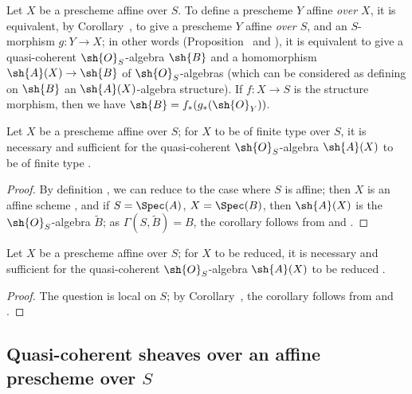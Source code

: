 \begin{env}[1.3.6]
\label{II.1.3.6}
Let $X$ be a prescheme affine over $S$.
To define a prescheme $Y$ affine \emph{over $X$}, it is equivalent, by Corollary~, to give a prescheme $Y$ affine \emph{over $S$}, and an $S$-morphism $g:Y\to X$; in other words (Proposition~ and ), it is equivalent to give a quasi-coherent $\sh{O}_S$-algebra $\sh{B}$ and a homomorphism $\sh{A}(X)\to\sh{B}$ of $\sh{O}_S$-algebras (which can be considered as defining on $\sh{B}$ an $\sh{A}(X)$-algebra structure).
If $f:X\to S$ is the structure morphism, then we have $\sh{B}=f_*(g_*(\sh{O}_Y))$.
\end{env}

\begin{corollary}[1.3.7]
\label{II.1.3.7}
Let $X$ be a prescheme affine over $S$; for $X$ to be of finite type over $S$, it is necessary and sufficient for the quasi-coherent $\sh{O}_S$-algebra $\sh{A}(X)$ to be of finite type .
\end{corollary}

\begin{proof}
By definition , we can reduce to the case where $S$ is affine; then $X$ is an affine scheme , and if $S=\Spec(A)$, $X=\Spec(B)$, then $\sh{A}(X)$ is the $\sh{O}_S$-algebra $\widetilde{B}$; as $\Gamma(S,\widetilde{B})=B$, the corollary follows from  and .
\end{proof}

\begin{corollary}[1.3.8]
\label{II.1.3.8}
Let $X$ be a prescheme affine over $S$; for $X$ to be reduced, it is necessary and sufficient for the quasi-coherent $\sh{O}_S$-algebra $\sh{A}(X)$ to be reduced .
\end{corollary}

\begin{proof}
The question is local on $S$; by Corollary~, the corollary follows from  and .
\end{proof}

\subsection{Quasi-coherent sheaves over an affine prescheme over $S$}
\label{subsection:II.1.4}

